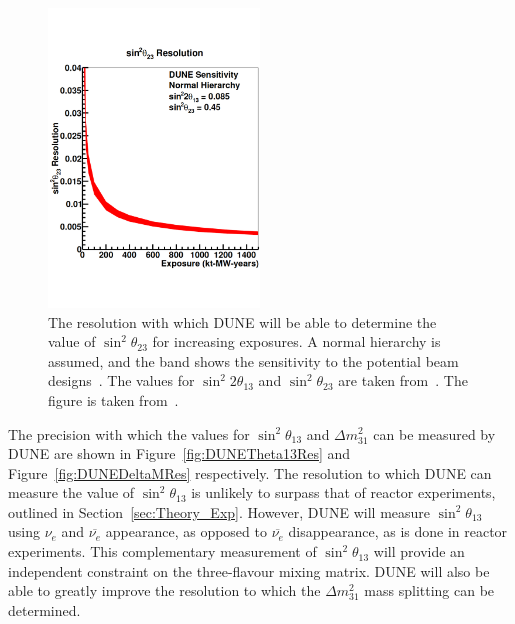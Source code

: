 \begin{figure}
  \centering
  \includegraphics[width=0.5\textwidth]{DUNETheta23Res}
  \caption[The resolution with which DUNE will be able to determine the value of $\sin^{2}\theta_{23}$ for increasing exposures]
          {The resolution with which DUNE will be able to determine the value of $\sin^{2}\theta_{23}$ for increasing exposures. A normal hierarchy is assumed, and the band shows the sensitivity to the potential beam designs~\citep{DUNECDR_V3}. The values for $\sin^{2}2\theta_{13}$ and $\sin^{2}\theta_{23}$ are taken from~\citep{NuFit2014}. The figure is taken from~\citep{DUNECDR_V2}.}
  \label{fig:DUNETheta23Res}
\end{figure}

The precision with which the values for $\sin^{2}\theta_{13}$ and $\Delta m^{2}_{31}$ can be measured by DUNE are shown in Figure~\ref{fig:DUNETheta13Res} and Figure~\ref{fig:DUNEDeltaMRes} respectively. The resolution to which DUNE can measure the value of $\sin^{2}\theta_{13}$ is unlikely to surpass that of reactor experiments, outlined in Section~\ref{sec:Theory_Exp}. However, DUNE will measure $\sin^{2}\theta_{13}$ using $\nu_e$ and $\overline{\nu_e}$ appearance, as opposed to $\overline{\nu_e}$ disappearance, as is done in reactor experiments. This complementary measurement of $\sin^{2}\theta_{13}$ will provide an independent constraint on the three-flavour mixing matrix. DUNE will also be able to greatly improve the resolution to which the $\Delta m^{2}_{31}$ mass splitting can be determined. \\

